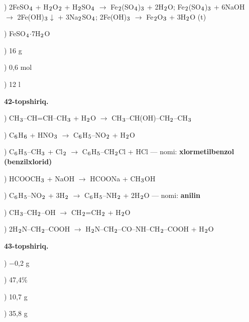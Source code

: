 \documentclass[11pt,a4paper]{article}
\renewcommand{\textsubscript}[1]{\ensuremath{_{\text{\fontsize{8}{8}\selectfont #1}}}}
\begin{document}
) 2FeSO\textsubscript{4} + H\textsubscript{2}O\textsubscript{2} + H\textsubscript{2}SO\textsubscript{4} $\to$ Fe\textsubscript{2}(SO\textsubscript{4})\textsubscript{3} + 2H\textsubscript{2}O; Fe\textsubscript{2}(SO\textsubscript{4})\textsubscript{3} + 6NaOH $\to$ 2Fe(OH)\textsubscript{3}$\downarrow$ + 3Na\textsubscript{2}SO\textsubscript{4}; 2Fe(OH)\textsubscript{3} $\to$ Fe\textsubscript{2}O\textsubscript{3} + 3H\textsubscript{2}O (t)\par
{}) FeSO\textsubscript{4}$\cdot$7H\textsubscript{2}O\par
{}) 16 g\par
{}) 0,6 mol\par
{}) 12 l\par
\noindent\textbf{42-topshiriq.}\par
{}) CH\textsubscript{3}--CH=CH--CH\textsubscript{3} + H\textsubscript{2}O $\to$ CH\textsubscript{3}--CH(OH)--CH\textsubscript{2}--CH\textsubscript{3}\par
{}) C\textsubscript{6}H\textsubscript{6} + HNO\textsubscript{3} $\to$ C\textsubscript{6}H\textsubscript{5}--NO\textsubscript{2} + H\textsubscript{2}O\par
{}) C\textsubscript{6}H\textsubscript{5}--CH\textsubscript{3} + Cl\textsubscript{2} $\to$ C\textsubscript{6}H\textsubscript{5}--CH\textsubscript{2}Cl + HCl --- nomi: \textbf{xlormetilbenzol (benzilxlorid)}\par
{}) HCOOCH\textsubscript{3} + NaOH $\to$ HCOONa + CH\textsubscript{3}OH\par
{}) C\textsubscript{6}H\textsubscript{5}--NO\textsubscript{2} + 3H\textsubscript{2} $\to$ C\textsubscript{6}H\textsubscript{5}--NH\textsubscript{2} + 2H\textsubscript{2}O --- nomi: \textbf{anilin}\par
{}) CH\textsubscript{3}--CH\textsubscript{2}--OH $\to$ CH\textsubscript{2}=CH\textsubscript{2} + H\textsubscript{2}O\par
{}) 2H\textsubscript{2}N--CH\textsubscript{2}--COOH $\to$ H\textsubscript{2}N--CH\textsubscript{2}--CO--NH--CH\textsubscript{2}--COOH + H\textsubscript{2}O\par
\noindent\textbf{43-topshiriq.}\par
{}) $-$0,2 g\par
{}) 47,4\%\par
{}) 10,7 g\par
{}) 35,8 g\par
\end{document}
